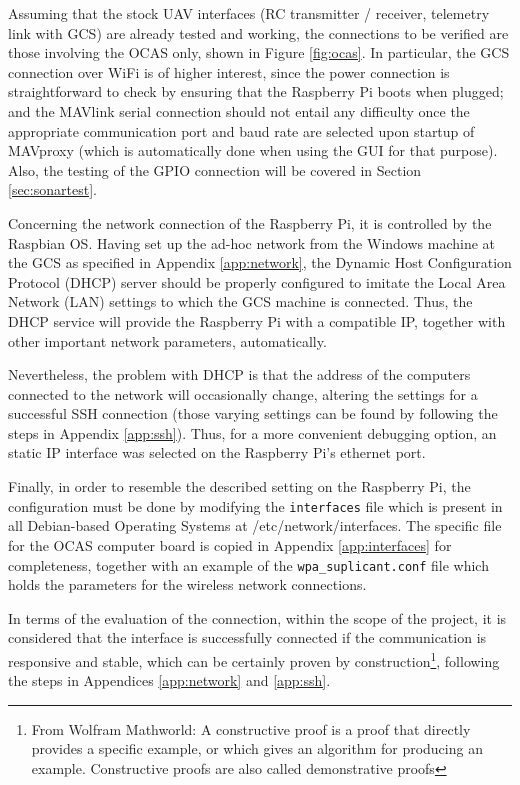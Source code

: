 Assuming that the stock UAV interfaces (RC transmitter / receiver, telemetry link with GCS) are already tested and working, the connections to be verified are those involving the OCAS only, shown in Figure \ref{fig:ocas}.
In particular, the GCS connection over WiFi is of higher interest, since the power connection is straightforward to check by ensuring that the Raspberry Pi boots when plugged; and the MAVlink serial connection should not entail any difficulty once the appropriate communication port and baud rate are selected upon startup of MAVproxy (which is automatically done when using the GUI for that purpose).
Also, the testing of the GPIO connection will be covered in Section \ref{sec:sonartest}.

Concerning the network connection of the Raspberry Pi, it is controlled by the Raspbian OS.
Having set up the ad-hoc network from the Windows machine at the GCS as specified in Appendix \ref{app:network}, the Dynamic Host Configuration Protocol (DHCP) server should be properly configured to imitate the Local Area Network (LAN) settings to which the GCS machine is connected.
Thus, the DHCP service will provide the Raspberry Pi with a compatible IP, together with other important network parameters, automatically. 

Nevertheless, the problem with DHCP is that the address of the computers connected to the network will occasionally change, altering the settings for a successful SSH connection (those varying settings can be found by following the steps in Appendix \ref{app:ssh}).
Thus, for a more convenient debugging option, an static IP interface was selected on the Raspberry Pi's ethernet port.

Finally, in order to resemble the described setting on the Raspberry Pi, the configuration must be done by modifying the \texttt{interfaces} file which is present in all Debian-based Operating Systems at /etc/network/interfaces.
The specific file for the OCAS computer board is copied in Appendix \ref{app:interfaces} for completeness, together with an example of the \texttt{wpa\_suplicant.conf} file which holds the parameters for the wireless network connections.

In terms of the evaluation of the connection, within the scope of the project, it is considered that the interface is successfully connected if the communication is responsive and stable, which can be certainly proven by construction\footnote{From Wolfram Mathworld: A constructive proof is a proof that directly provides a specific example, or which gives an algorithm for producing an example. Constructive proofs are also called demonstrative proofs}, following the steps in Appendices \ref{app:network} and \ref{app:ssh}.


